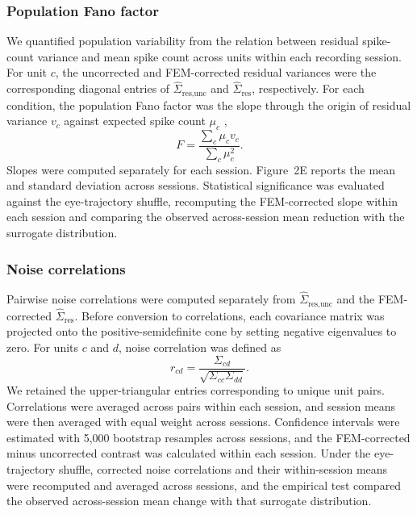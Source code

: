 \documentclass{lite}
\begin{document}
\subsubsection{Population Fano factor}
We quantified population variability from the relation between residual spike-count variance and mean spike count across units within each recording session. For unit $c$, the uncorrected and FEM-corrected residual variances were the corresponding diagonal entries of $\hat{\Sigma}_{\text{res}, \text{unc}}$ and $\hat{\Sigma}_{\mathrm{res}}$, respectively. For each condition, the population Fano factor was the slope through the origin of residual variance $v_c$ against expected spike count $\mu_c$ \cite{churchland2010stimulus},
\begin{equation}
F = \frac{\sum_c \mu_c v_c}{\sum_c \mu_c^2}.
\end{equation}
Slopes were computed separately for each session. Figure~2E reports the mean and standard deviation across sessions. Statistical significance was evaluated against the eye-trajectory shuffle, recomputing the FEM-corrected slope within each session and comparing the observed across-session mean reduction with the surrogate distribution.

\subsubsection{Noise correlations}
Pairwise noise correlations were computed separately from $\hat{\Sigma}_{\text{res}, \text{unc}}$ and the FEM-corrected $\hat{\Sigma}_{\mathrm{res}}$. Before conversion to correlations, each covariance matrix was projected onto the positive-semidefinite cone by setting negative eigenvalues to zero. For units $c$ and $d$, noise correlation was defined as
\begin{equation}
r_{cd} = \frac{\Sigma_{cd}}{\sqrt{\Sigma_{cc}\Sigma_{dd}}}.
\end{equation}
We retained the upper-triangular entries corresponding to unique unit pairs. Correlations were averaged across pairs within each session, and session means were then averaged with equal weight across sessions. Confidence intervals were estimated with 5,000 bootstrap resamples across sessions, and the FEM-corrected minus uncorrected contrast was calculated within each session. Under the eye-trajectory shuffle, corrected noise correlations and their within-session means were recomputed and averaged across sessions, and the empirical test compared the observed across-session mean change with that surrogate distribution.
\end{document}

